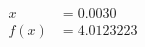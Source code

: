 \documentclass[preview]{standalone}
\begin{document}
\begin{align*}
x &= 0.0030\\f(x) &= 4.0123223
\end{align*}
\end{document}
